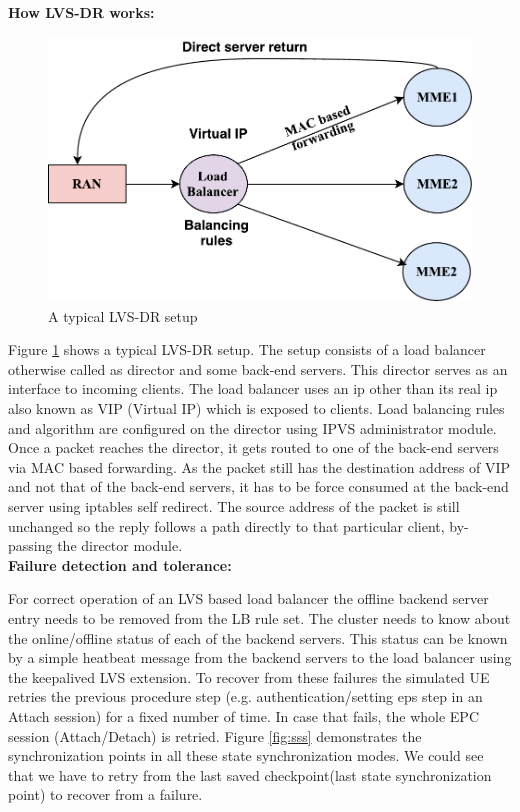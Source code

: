 \documentclass[hidelinks]{report}
\begin{document}
\noindent\textbf{How LVS-DR works:}
\begin{figure}[H]	
\centering
\includegraphics[scale= 0.65]{images/lvs.pdf}
\caption{A typical LVS-DR setup}
\label{fig:lbi}
\end{figure}
Figure \ref{fig:lbi} shows a typical LVS-DR setup. The setup consists of a load balancer otherwise called as director and some back-end servers. This director serves as an interface to incoming clients. The load balancer uses an ip other than its real ip also known as VIP (Virtual IP) which is exposed to clients. Load balancing rules and algorithm are configured on the director using IPVS administrator module. Once a packet reaches the director, it gets routed to one of the back-end servers via MAC based forwarding. As the packet still has the destination address of VIP and not that of the back-end servers, it has to be force consumed at the back-end server using iptables self redirect. The source address of the packet is still unchanged so the reply follows a path directly to that particular client, by-passing the director module.\\


\noindent\textbf{Failure detection and tolerance:}

For correct operation of an LVS based load balancer the offline backend server entry needs to be removed from the LB rule set. The cluster needs to know about the  online/offline status of each of the backend servers. This status can be known by a simple heatbeat message from the backend servers to the load balancer using the keepalived LVS extension. To recover from these failures the simulated UE retries the previous procedure step (e.g. authentication/setting eps step in an Attach session) for a fixed number of time. In case that fails, the whole EPC session (Attach/Detach) is retried. Figure \ref{fig:sss} demonstrates the synchronization points in all these state synchronization modes. We could see that we have to retry from the last saved checkpoint(last state synchronization point) to recover from a failure.
\end{document}
